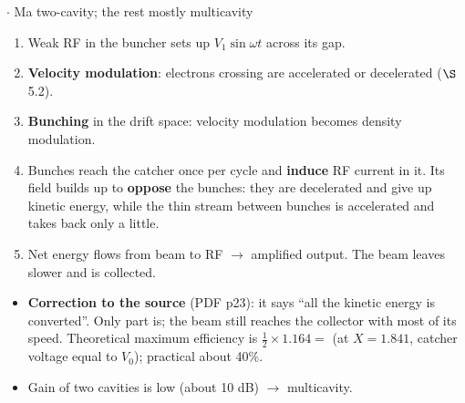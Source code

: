 {\color{sub}\footnotesize {}  \gap$\cdot$ Ma two-cavity; the rest mostly multicavity}


\begin{enumerate}[label=\arabic*., leftmargin=1.4em, itemsep=1pt]
  \item Weak RF in the buncher sets up $V_1\sin\omega t$ across its gap.
  \item \textbf{Velocity modulation}: electrons crossing are accelerated or decelerated
    ($\S$5.2).
  \item \textbf{Bunching} in the drift space: velocity modulation becomes density
    modulation.
  \item Bunches reach the catcher once per cycle and \textbf{induce} RF current in it. Its
    field builds up to \textbf{oppose} the bunches: they are decelerated and give up
    kinetic energy, while the thin stream between bunches is accelerated and takes back
    only a little.
  \item Net energy flows from beam to RF $\rightarrow$ amplified output. The beam leaves
    slower and is collected.
\end{enumerate}
\begin{itemize}
  \item \textbf{Correction to the source} (PDF p23): it says ``all the kinetic energy is
    converted''. Only part is; the beam still reaches the collector with most of its speed.
    Theoretical maximum efficiency is $\tfrac{1}{2}\times 1.164 = $  (at
    $X = 1.841$, catcher voltage equal to $V_0$); practical about 40\%. \added{}
  \item Gain of two cavities is low (about 10 dB) $\rightarrow$ multicavity.
\end{itemize}


